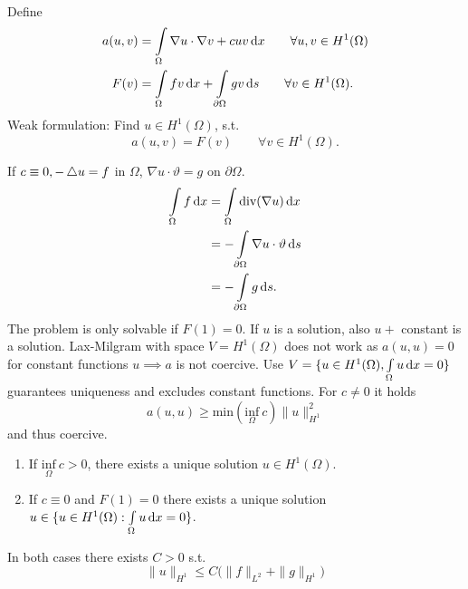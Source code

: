 \begin{enumerate}[=(\alph*)]
\begin{align*}
	\end{align*}
	Define 
	\begin{align*}
		a(u,v) &= \int \limits_\Omega \nabla u \cdot  \nabla v + cuv \mathop{}\!\mathrm{d} x \qquad \forall u,v\in H^1(\Omega)\\
		F(v) &= \int \limits_\Omega fv \mathop{}\!\mathrm{d} x + \int \limits_{\partial\Omega} gv \mathop{}\!\mathrm{d} s \qquad \forall v \in H^1(\Omega).
	\end{align*}
	Weak formulation: Find $u \in H^1(\Omega)$, s.t.
	\begin{equation*}
		a(u,v) = F(v) \qquad \forall v \in H^1(\Omega).
	\end{equation*}
	\begin{comment_}
		If $c \equiv 0, -\mathop{}\!\mathbin\bigtriangleup u=f$ in $\Omega$, $\nabla u\cdot\vartheta = g$ on $\partial \Omega$.
		\begin{align*}
			\int \limits_\Omega f \mathop{}\!\mathrm{d} x &= \int \limits_\Omega \text{div}(\nabla u) \mathop{}\!\mathrm{d} x\\
			&= -\int \limits_{\partial \Omega} \nabla u \cdot  \vartheta \mathop{}\!\mathrm{d} s\\
			&= -\int \limits_{\partial \Omega} g \mathop{}\!\mathrm{d} s.
		\end{align*}
		The problem is only solvable if $F(1)=0$. If $u$ is a solution, also $u +$ constant is a solution.\enter
		Lax-Milgram with space $V = H^1(\Omega)$ does not work as $a(u,u)=0$ for constant functions $u \implies a$ is not coercive.\enter
		Use $V = \{ u \in H^1(\Omega), \int \limits_\Omega u \mathop{}\!\mathrm{d} x =0 \}$ guarantees uniqueness and excludes constant functions. For $c \neq 0$ it holds 
		\begin{equation*}
			a(u,u) \geq \text{min}\left( \underset{\Omega}{\text{inf}}\ c \right)\|u\|^2_{H^1} 
		\end{equation*}
		and thus coercive.
	\end{comment_}
	\begin{thrm}\enter
		\begin{enumerate}[label=(\Roman*)]
			\item If $\underset{\Omega}{\text{inf}}\ c > 0$, there exists a unique solution $u \in H^1(\Omega)$.
			\item If $c \equiv 0$ and $F(1)=0$ there exists a unique solution $u \in \{ u \in H^1(\Omega): \int \limits_\Omega u \mathop{}\!\mathrm{d} x =0 \}$.
		\end{enumerate}
		In both cases there exists $C > 0$ s.t. 
		\begin{equation*}
			\|u\|_{H^1} \leq C \big ( \|f\|_{L^2} + \|g\|_{H^1} \big )	
		\end{equation*}

\end{thrm}
\end{enumerate}
